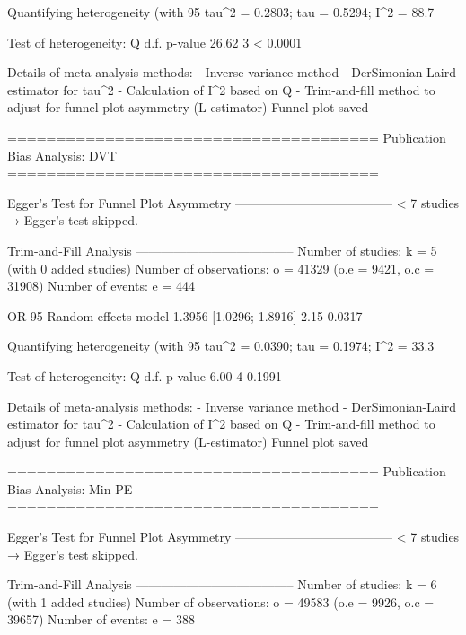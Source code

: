 Quantifying heterogeneity (with 95%
 tau^2 = 0.2803; tau = 0.5294; I^2 = 88.7%

Test of heterogeneity:
     Q d.f.  p-value
 26.62    3 < 0.0001

Details of meta-analysis methods:
- Inverse variance method
- DerSimonian-Laird estimator for tau^2
- Calculation of I^2 based on Q
- Trim-and-fill method to adjust for funnel plot asymmetry (L-estimator)
  Funnel plot saved

======================================
Publication Bias Analysis: DVT 
======================================
                                                                                                                                                        
Egger's Test for Funnel Plot Asymmetry
--------------------------------------
  < 7 studies → Egger’s test skipped.

Trim-and-Fill Analysis
--------------------------------------
Number of studies: k = 5 (with 0 added studies)
Number of observations: o = 41329 (o.e = 9421, o.c = 31908)
Number of events: e = 444

                         OR           95%
Random effects model 1.3956 [1.0296; 1.8916] 2.15  0.0317

Quantifying heterogeneity (with 95%
 tau^2 = 0.0390; tau = 0.1974; I^2 = 33.3%

Test of heterogeneity:
    Q d.f. p-value
 6.00    4  0.1991

Details of meta-analysis methods:
- Inverse variance method
- DerSimonian-Laird estimator for tau^2
- Calculation of I^2 based on Q
- Trim-and-fill method to adjust for funnel plot asymmetry (L-estimator)
  Funnel plot saved

======================================
Publication Bias Analysis: Min PE 
======================================
                                                                                                                                                        
Egger's Test for Funnel Plot Asymmetry
--------------------------------------
  < 7 studies → Egger’s test skipped.

Trim-and-Fill Analysis
--------------------------------------
Number of studies: k = 6 (with 1 added studies)
Number of observations: o = 49583 (o.e = 9926, o.c = 39657)
Number of events: e = 388

